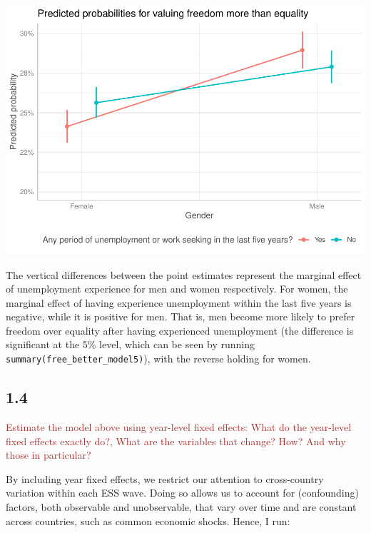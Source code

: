 \documentclass[
]{article}
\begin{document}
\includegraphics{AVCD-Assignment3-Edenhofer_files/figure-latex/predicted-probabilities-plot-1.pdf}

The vertical differences between the point estimates represent the
marginal effect of unemployment experience for men and women
respectively. For women, the marginal effect of having experience
unemployment within the last five years is negative, while it is
positive for men. That is, men become more likely to prefer freedom over
equality after having experienced unemployment (the difference is
significant at the 5\% level, which can be seen by running
\texttt{summary(free\_better\_model5)}), with the reverse holding for
women.

\hypertarget{section-3}{%
\subsection{1.4}\label{section-3}}

\textcolor{brown}{Estimate the model above using year-level fixed effects: What do the year-level fixed effects exactly do?, What are the variables that change? How? And why those in particular?}

By including year fixed effects, we restrict our attention to
cross-country variation within each ESS wave. Doing so allows us to
account for (confounding) factors, both observable and unobservable,
that vary over time and are constant across countries, such as common
economic shocks. Hence, I run:
\end{document}
